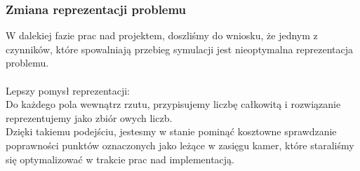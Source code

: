\documentclass[12pt,a4paper]{article}
\begin{document}
\subsubsection{Zmiana reprezentacji problemu}
W dalekiej fazie prac nad projektem, doszliśmy do wniosku,
że jednym z czynników, które spowalniają przebieg symulacji jest nieoptymalna
reprezentacja problemu.\\ \\
Lepszy pomysł reprezentacji: \\
Do każdego pola wewnątrz rzutu, przypisujemy liczbę całkowitą i rozwiązanie
reprezentujemy jako zbiór owych liczb. \\
Dzięki takiemu podejściu, jestesmy w stanie pominąć kosztowne sprawdzanie
poprawności punktów oznaczonych jako leżące w zasięgu kamer,
które staraliśmy się optymalizować w trakcie prac nad implementacją.
\end{document}
